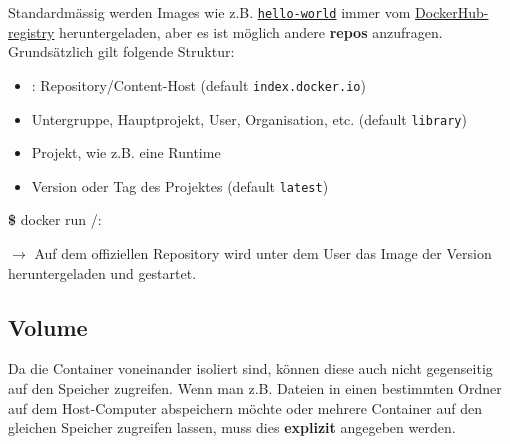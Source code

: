 \documentclass[
  10pt,
  a4paper,
  twocolumn]{article}
\newenvironment{Shaded}{}{}
\newcommand{\ExtensionTok}[1]{\textcolor[rgb]{0.84,0.23,0.29}{\textbf{#1}}}
\newcommand{\NormalTok}[1]{\textcolor[rgb]{0.14,0.16,0.18}{#1}}
\providecommand{\tightlist}{%
  \setlength{\itemsep}{0pt}\setlength{\parskip}{0pt}}\usepackage{longtable,booktabs,array}
\begin{document}
Standardmässig werden Images wie z.B.
\href{https://registry.hub.docker.com/_/hello-world}{\texttt{hello-world}}
immer vom \href{https://registry.hub.docker.com/}{DockerHub-registry}
heruntergeladen, aber es ist möglich andere \textbf{repos} anzufragen.
Grundsätzlich gilt folgende Struktur:

\begin{center}
\texttt{\textbf{\color{BrickRed}{<repo>}}{\color{Gray}{/}}\textbf{\color{OliveGreen}{<source>}}{\color{Gray}{/}}\textbf{\color{NavyBlue}{<image>}}{\color{Gray}{/}}\textbf{\color{Periwinkle}{<tag>}}}

\end{center}

\begin{itemize}
\tightlist
\item
  \textbf{\texttt{\color{BrickRed}{<repo>}}}: Repository/Content-Host
  (default \texttt{index.docker.io})
\item
  \textbf{\texttt{\color{OliveGreen}{<source>}}} Untergruppe,
  Hauptprojekt, User, Organisation, etc. (default \texttt{library})
\item
  \textbf{\texttt{\color{NavyBlue}{<image>}}} Projekt, wie z.B. eine
  Runtime
\item
  \textbf{\texttt{\color{Periwinkle}{<tag>}}} Version oder Tag des
  Projektes (default \texttt{latest})
\end{itemize}

\begin{Shaded}
\begin{Highlighting}[]
\ExtensionTok{\$}\NormalTok{ docker run }\textbf{\texttt{\color{OliveGreen}{kaohslu}}}/\textbf{\texttt{\color{NavyBlue}{01-demo-img}}}:\textbf{\texttt{\color{Periwinkle}{latest}}}
\end{Highlighting}
\end{Shaded}

\(\rightarrow\) Auf dem offiziellen Repository
\textbf{\texttt{\color{BrickRed}{DockerHub}}} wird unter dem User
\textbf{\texttt{\color{OliveGreen}{kaohslu}}} das Image
\textbf{\texttt{\color{NavyBlue}{01-demo-img}}} der Version
\textbf{\texttt{\color{Periwinkle}{latest}}} heruntergeladen und
gestartet.

\subsection{Volume}\label{volume}

Da die Container voneinander isoliert sind, können diese auch nicht
gegenseitig auf den Speicher zugreifen. Wenn man z.B. Dateien in einen
bestimmten Ordner auf dem Host-Computer abspeichern möchte oder mehrere
Container auf den gleichen Speicher zugreifen lassen, muss dies
\textbf{explizit} angegeben werden.
\end{document}
